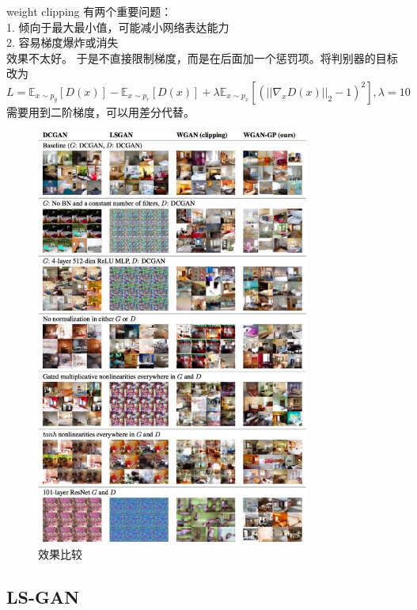 \documentclass[a4paper]{article}
\begin{document}
weight clipping 有两个重要问题：\\
1. 倾向于最大最小值，可能减小网络表达能力\\
2. 容易梯度爆炸或消失\\
效果不太好。
于是不直接限制梯度，而是在后面加一个惩罚项。将判别器的目标改为
$$L = \mathbb{E}_{x\sim p_g}[D(x)]-\mathbb{E}_{x\sim p_r}[D(x)] + \lambda\mathbb{E}_{x\sim p_x}[(||\nabla_xD(x)||_2-1)^2], \lambda = 10$$
需要用到二阶梯度，可以用差分代替。
\begin{figure}
\centering
\includegraphics[width=0.8\textwidth]{./img/6.jpg}
\caption{效果比较}
\label{fig:6}
\end{figure}
\subsection{LS-GAN}
\end{document}
